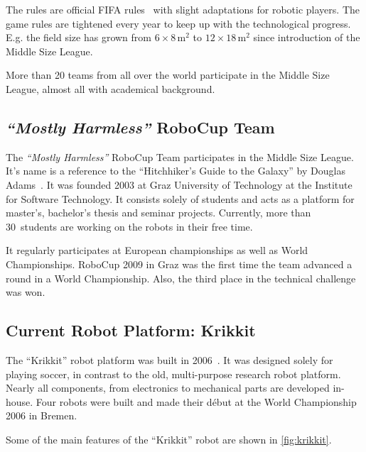 \documentclass[12pt,a4paper]{article}
\newcommand{\MH}{\emph{``Mostly Harmless''} RoboCup Team\xspace}
\newcommand{\MSL}{Middle Size League\xspace}
\begin{document}
The rules are official FIFA rules~\cite{msl-rules} with slight adaptations for robotic players.
The game rules are tightened every year to keep up with the technological progress. 
E.g. the field size has grown from $6\times8$\,m$^2$ to $12\times18$\,m$^2$ since introduction of the \MSL.

More than 20 teams from all over the world participate in the \MSL, almost all with academical background.


\subsection{\MH}

The \MH participates in the \MSL. 
It's name is a reference to the ``Hitchhiker's Guide to the Galaxy'' by Douglas Adams~\cite{h2g2}.
It was founded 2003 at Graz University of Technology at the Institute for Software Technology. 
It consists solely of students and acts as a platform for master's, bachelor's thesis and seminar projects.
Currently, more than 30~students are working on the robots in their free time.

It regularly participates at European championships as well as World Championships.
RoboCup 2009 in Graz was the first time the team advanced a round in a World Championship. 
Also, the third place in the technical challenge was won.




\subsection{Current Robot Platform: Krikkit}

The ``Krikkit'' robot platform was built in 2006~\cite{}. 
It was designed solely for playing soccer, in contrast to the old, multi-purpose research robot platform.
Nearly all components, from electronics to mechanical parts are developed in-house.
Four robots were built and made their début at the World Championship 2006 in Bremen.

Some of the main features of the ``Krikkit'' robot are shown in \autoref{fig:krikkit}.
\end{document}
